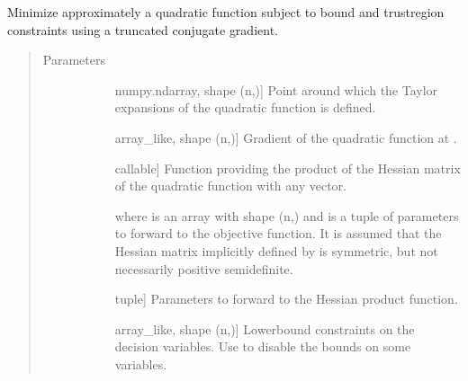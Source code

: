 \documentclass[letterpaper,10pt,english]{sphinxmanual}
\begin{document}
\begin{fulllineitems}
\label{\detokenize{refs/generated/cobyqa.linalg.bvtcg:cobyqa.linalg.bvtcg}}
\sphinxAtStartPar
Minimize approximately a quadratic function subject to bound and
trust\sphinxhyphen{}region constraints using a truncated conjugate gradient.
\begin{quote}\begin{description}
\item[{Parameters}] \leavevmode\begin{description}
\item[{}] \leavevmode{[}numpy.ndarray, shape (n,){]}
\sphinxAtStartPar
Point around which the Taylor expansions of the quadratic function is
defined.

\item[{}] \leavevmode{[}array\_like, shape (n,){]}
\sphinxAtStartPar
Gradient of the quadratic function at .

\item[{}] \leavevmode{[}callable{]}
\sphinxAtStartPar
Function providing the product of the Hessian matrix of the quadratic
function with any vector.
\begin{quote}

\sphinxAtStartPar
{}
\end{quote}

\sphinxAtStartPar
where  is an array with shape (n,) and  is a tuple of
parameters to forward to the objective function. It is assumed that the
Hessian matrix implicitly defined by  is symmetric, but not
necessarily positive semidefinite.

\item[{}] \leavevmode{[}tuple{]}
\sphinxAtStartPar
Parameters to forward to the Hessian product function.

\item[{}] \leavevmode{[}array\_like, shape (n,){]}
\sphinxAtStartPar
Lower\sphinxhyphen{}bound constraints on the decision variables. Use  to
disable the bounds on some variables.


\end{description}
\end{description}
\end{quote}
\end{fulllineitems}
\end{document}
